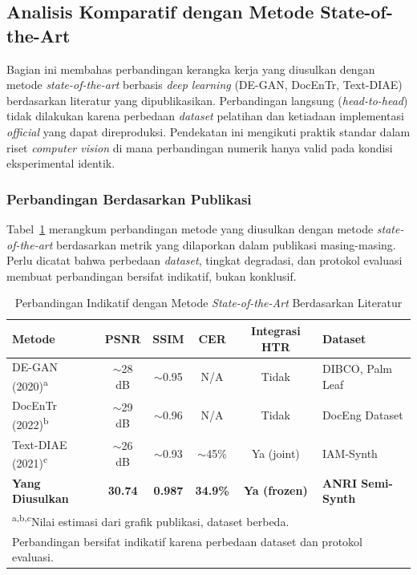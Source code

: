 \documentclass[12pt,a4paper]{article}
\begin{document}
\vspace{0.8em}

\subsection{Analisis Komparatif dengan Metode State-of-the-Art}
\label{subsec:analisis-komparatif}
\vspace{0.8em}

Bagian ini membahas perbandingan kerangka kerja yang diusulkan dengan metode \textit{state-of-the-art} berbasis \textit{deep learning} (DE-GAN, DocEnTr, Text-DIAE) berdasarkan literatur yang dipublikasikan. Perbandingan langsung (\textit{head-to-head}) tidak dilakukan karena perbedaan \textit{dataset} pelatihan dan ketiadaan implementasi \textit{official} yang dapat direproduksi. Pendekatan ini mengikuti praktik standar dalam riset \textit{computer vision} di mana perbandingan numerik hanya valid pada kondisi eksperimental identik.

\subsubsection{Perbandingan Berdasarkan Publikasi}
\label{subsubsec:perbandingan-publikasi}

Tabel~\ref{table:sota-comparison-literature} merangkum perbandingan metode yang diusulkan dengan metode \textit{state-of-the-art} berdasarkan metrik yang dilaporkan dalam publikasi masing-masing. Perlu dicatat bahwa perbedaan \textit{dataset}, tingkat degradasi, dan protokol evaluasi membuat perbandingan bersifat indikatif, bukan konklusif.

\begin{table}[H]
\renewcommand{\arraystretch}{1.3}
\centering
\caption{Perbandingan Indikatif dengan Metode \textit{State-of-the-Art} Berdasarkan Literatur}
\label{table:sota-comparison-literature}
\small
\begin{tabular}{|l|c|c|c|c|l|}
\hline
\textbf{Metode} & \textbf{PSNR} & \textbf{SSIM} & \textbf{CER} & \textbf{Integrasi HTR} & \textbf{Dataset} \\
\hline
DE-GAN (2020)\textsuperscript{a} & $\sim$28 dB & $\sim$0.95 & N/A & Tidak & DIBCO, Palm Leaf \\
DocEnTr (2022)\textsuperscript{b} & $\sim$29 dB & $\sim$0.96 & N/A & Tidak & DocEng Dataset \\
Text-DIAE (2021)\textsuperscript{c} & $\sim$26 dB & $\sim$0.93 & $\sim$45\% & Ya (joint) & IAM-Synth \\
\hline
\textbf{Yang Diusulkan} & \textbf{30.74} & \textbf{0.987} & \textbf{34.9\%} & \textbf{Ya (frozen)} & \textbf{ANRI Semi-Synth} \\
\hline
\multicolumn{6}{l}{\footnotesize \textsuperscript{a,b,c}Nilai estimasi dari grafik publikasi, dataset berbeda.} \\
\multicolumn{6}{l}{\footnotesize Perbandingan bersifat indikatif karena perbedaan dataset dan protokol evaluasi.} \\
\end{tabular}
\end{table}
\end{document}
